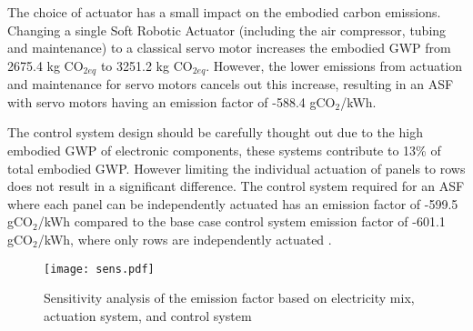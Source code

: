 The choice of actuator has a small impact on the embodied carbon emissions. Changing a single Soft Robotic Actuator (including the air compressor, tubing and maintenance) to a classical servo motor increases the embodied GWP from 2675.4 kg CO$_{2eq}$ to 3251.2 kg CO$_{2eq}$. However, the lower emissions from actuation and maintenance for servo motors cancels out this increase, resulting in an ASF with servo motors having an emission factor of -588.4 gCO${_2}$/kWh.

The control system design should be carefully thought out due to the high embodied GWP of electronic components, these systems contribute to 13\% of total embodied GWP. However limiting the individual actuation of panels to rows does not result in a significant difference. The control system required for an ASF where each panel can be independently actuated has an emission factor of -599.5 gCO${_2}$/kWh compared to the base case control system emission factor of -601.1 gCO${_2}$/kWh, where only rows are independently actuated .\\



\begin{figure}[H]
\begin{center}
\texttt{[image: sens.pdf]}
\caption{Sensitivity analysis of the emission factor based on electricity mix, actuation system, and control system}
\label{fig:sens}
\end{center}
\end{figure}


